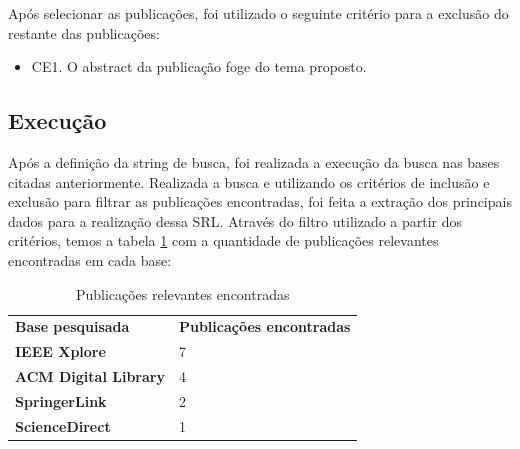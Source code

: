 \documentclass[12pt]{article}
\begin{document}
Após selecionar as publicações, foi utilizado o seguinte critério para a exclusão do restante das publicações:

\begin{itemize}
  \item CE1. O abstract da publicação foge do tema proposto.
\end{itemize}

\subsection{Execução}

Após a definição da string de busca, foi realizada a execução da busca nas bases citadas anteriormente. Realizada a
busca e utilizando os critérios de inclusão e exclusão para filtrar as publicações encontradas, foi feita a extração 
dos principais dados para a realização dessa SRL. Através do filtro utilizado a partir dos critérios,
temos a tabela \ref{publicacoes} com a quantidade de publicações relevantes encontradas em cada base:


\begin{table}[h]
  \centering
  {\renewcommand\arraystretch{1.25}
  \begin{tabular}{ l l }
    \cline{1-1}\cline{2-2}
    \multicolumn{1}{|p{4.500cm}|}{\textbf{Base pesquisada}} &
    \multicolumn{1}{p{4.500cm}|}{\textbf{Publicações encontradas}}
    \\
    \cline{1-1}\cline{2-2}
    \multicolumn{1}{|p{4.500cm}|}{\textbf{IEEE Xplore} \centering } &
    \multicolumn{1}{p{4.500cm}|}{7 \centering }
    \\
    \cline{1-1}\cline{2-2}
    \multicolumn{1}{|p{4.500cm}|}{\textbf{ACM Digital Library} \centering } &
    \multicolumn{1}{p{4.500cm}|}{4 \centering }
    \\
    \cline{1-1}\cline{2-2}
    \multicolumn{1}{|p{4.500cm}|}{\textbf{SpringerLink} \centering } &
    \multicolumn{1}{p{4.500cm}|}{2 \centering }
    \\
    \cline{1-1}\cline{2-2}
    \multicolumn{1}{|p{4.500cm}|}{\textbf{ScienceDirect} \centering } &
    \multicolumn{1}{p{4.500cm}|}{1 \centering }
    \\
    \hline
    
  \end{tabular} }
  \caption{Publicações relevantes encontradas} 
  \label{publicacoes} 
\end{table}
\end{document}
